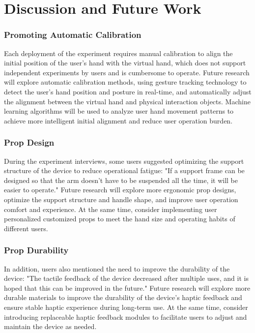 \documentclass[runningheads]{llncs}
\begin{document}
\section{Discussion and Future Work}
\subsubsection{Promoting Automatic Calibration}
Each deployment of the experiment requires manual calibration to align the initial position of the user's hand with the virtual hand, which does not support independent experiments by users and is cumbersome to operate. Future research will explore automatic calibration methods, using gesture tracking technology to detect the user's hand position and posture in real-time, and automatically adjust the alignment between the virtual hand and physical interaction objects. Machine learning algorithms will be used to analyze user hand movement patterns to achieve more intelligent initial alignment and reduce user operation burden.

\subsubsection {Prop Design}
During the experiment interviews, some users suggested optimizing the support structure of the device to reduce operational fatigue: "If a support frame can be designed so that the arm doesn't have to be suspended all the time, it will be easier to operate." Future research will explore more ergonomic prop designs, optimize the support structure and handle shape, and improve user operation comfort and experience. At the same time, consider implementing user personalized customized props to meet the hand size and operating habits of different users.

\subsubsection{Prop Durability}
In addition, users also mentioned the need to improve the durability of the device: "The tactile feedback of the device decreased after multiple uses, and it is hoped that this can be improved in the future." Future research will explore more durable materials to improve the durability of the device's haptic feedback and ensure stable haptic experience during long-term use. At the same time, consider introducing replaceable haptic feedback modules to facilitate users to adjust and maintain the device as needed.
\end{document}
